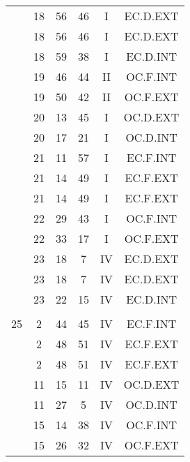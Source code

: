 \documentclass[12pt, a4paper]{article}
\begin{document}
\begin{multicols}{3}
{\begin{tabular}{c c c c c c}
	 	 	 	 & 18 & 56 & 46 & I & EC.D.EXT\\%
	 	 	 	 & 18 & 56 & 46 & I & EC.D.EXT\\%
	 	 	 	 & 18 & 59 & 38 & I & EC.D.INT\\%
	 	 	 	 & 19 & 46 & 44 & II & OC.F.INT\\%
	 	 	 	 & 19 & 50 & 42 & II & OC.F.EXT\\%
	 	 	 	 & 20 & 13 & 45 & I & OC.D.EXT\\%
	 	 	 	 & 20 & 17 & 21 & I & OC.D.INT\\%
	 	 	 	 & 21 & 11 & 57 & I & EC.F.INT\\%
	 	 	 	 & 21 & 14 & 49 & I & EC.F.EXT\\%
	 	 	 	 & 21 & 14 & 49 & I & EC.F.EXT\\%
	 	 	 	 & 22 & 29 & 43 & I & OC.F.INT\\%
	 	 	 	 & 22 & 33 & 17 & I & OC.F.EXT\\%
	 	 	 	 & 23 & 18 & 7 & IV & EC.D.EXT\\%
	 	 	 	 & 23 & 18 & 7 & IV & EC.D.EXT\\%
	 	 	 	 & 23 & 22 & 15 & IV & EC.D.INT\\%
	 	 	 	 & & & & & \\%
	 	 	 	25 & 2 & 44 & 45 & IV & EC.F.INT\\%
	 	 	 	 & 2 & 48 & 51 & IV & EC.F.EXT\\%
	 	 	 	 & 2 & 48 & 51 & IV & EC.F.EXT\\%
	 	 	 	 & 11 & 15 & 11 & IV & OC.D.EXT\\%
	 	 	 	 & 11 & 27 & 5 & IV & OC.D.INT\\%
	 	 	 	 & 15 & 14 & 38 & IV & OC.F.INT\\%
	 	 	 	 & 15 & 26 & 32 & IV & OC.F.EXT\\%

\end{tabular}}
\end{multicols}
\end{document}
